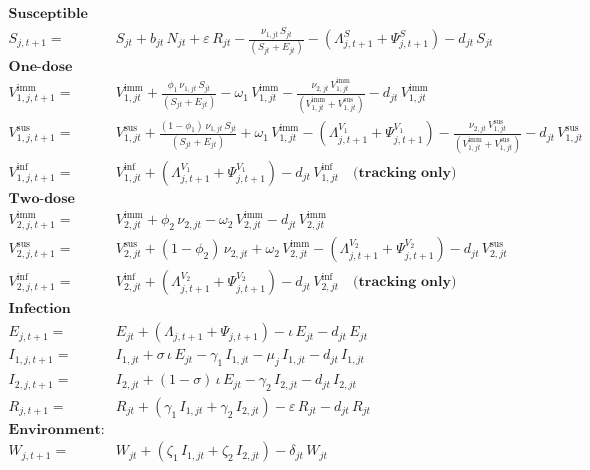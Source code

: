 \documentclass[
]{book}
\begin{document}
\begin{equation}
\begin{aligned}
\mathbf{\text{Susceptible population:}}\\[1mm]
S_{j,t+1} = \ & 
S_{jt} 
+ b_{jt}\,N_{jt} 
+ \varepsilon\,R_{jt} 
- \frac{\nu_{1,jt}\,S_{jt}}{\left(S_{jt}+E_{jt}\right)} 
- \left( \Lambda^{S}_{j,t+1} + \Psi^{S}_{j,t+1} \right) 
- d_{jt}\,S_{jt}\\[3mm]
\mathbf{\text{One-dose vaccination:}}\\[1mm]
V^{\text{imm}}_{1,j,t+1} = \ & 
V^{\text{imm}}_{1,jt} 
+ \frac{\phi_1\,\nu_{1,jt}\,S_{jt}}{\left(S_{jt}+E_{jt}\right)}
- \omega_1\,V^{\text{imm}}_{1,jt} 
- \frac{\nu_{2,jt}\,V^{\text{imm}}_{1,jt}}{\left(V^{\text{imm}}_{1,jt}+V^{\text{sus}}_{1,jt}\right)}
- d_{jt}\,V^{\text{imm}}_{1,jt}\\[1mm]
V^{\text{sus}}_{1,j,t+1} = \ & 
V^{\text{sus}}_{1,jt} 
+ \frac{\left(1-\phi_1\right)\,\nu_{1,jt}\,S_{jt}}{\left(S_{jt}+E_{jt}\right)}
+ \omega_1\,V^{\text{imm}}_{1,jt} 
- \left( \Lambda^{V_1}_{j,t+1} + \Psi^{V_1}_{j,t+1} \right) 
- \frac{\nu_{2,jt}\,V^{\text{sus}}_{1,jt}}{\left(V^{\text{imm}}_{1,jt}+V^{\text{sus}}_{1,jt}\right)} 
- d_{jt}\,V^{\text{sus}}_{1,jt}\\[1mm]
V^{\text{inf}}_{1,j,t+1} = \ & 
V^{\text{inf}}_{1,jt} 
+ \left( \Lambda^{V_1}_{j,t+1} + \Psi^{V_1}_{j,t+1} \right) 
- d_{jt}\,V^{\text{inf}}_{1,jt} \quad \mathbf{\text{(tracking only)}}\\[6mm]
\mathbf{\text{Two-dose vaccination:}}\\[3mm]
V^{\text{imm}}_{2,j,t+1} = \ & 
V^{\text{imm}}_{2,jt} 
+ \phi_2\,\nu_{2,jt} 
- \omega_2\,V^{\text{imm}}_{2,jt} 
- d_{jt}\,V^{\text{imm}}_{2,jt}\\[3mm]
V^{\text{sus}}_{2,j,t+1} = \ & 
V^{\text{sus}}_{2,jt} 
+ \left(1-\phi_2\right)\,\nu_{2,jt} 
+ \omega_2\,V^{\text{imm}}_{2,jt} 
- \left( \Lambda^{V_2}_{j,t+1} + \Psi^{V_2}_{j,t+1} \right) 
- d_{jt}\,V^{\text{sus}}_{2,jt}\\[3mm]
V^{\text{inf}}_{2,j,t+1} = \ &
V^{\text{inf}}_{2,jt} 
+ \left( \Lambda^{V_2}_{j,t+1} + \Psi^{V_2}_{j,t+1} \right) 
- d_{jt}\,V^{\text{inf}}_{2,jt} \quad \mathbf{\text{(tracking only)}}\\[6mm]
\mathbf{\text{Infection dynamics:}}\\[3mm]
E_{j,t+1} = \ &
E_{jt} 
+ \left( \Lambda_{j,t+1} + \Psi_{j,t+1}\right) 
- \iota\,E_{jt} 
- d_{jt}\,E_{jt}\\[3mm]
I_{1,j,t+1} = \ &
I_{1,jt} 
+ \sigma\,\iota\,E_{jt} 
- \gamma_1\,I_{1,jt} 
- \mu_j\,I_{1,jt} 
- d_{jt}\,I_{1,jt}\\[3mm]
I_{2,j,t+1} = \ &
I_{2,jt} 
+ \left(1-\sigma\right)\,\iota\,E_{jt} 
- \gamma_2\,I_{2,jt} 
- d_{jt}\,I_{2,jt}\\[3mm]
R_{j,t+1} = \ &
R_{jt} 
+ \left( \gamma_1\,I_{1,jt} + \gamma_2\,I_{2,jt} \right) 
- \varepsilon\,R_{jt} 
- d_{jt}\,R_{jt}\\[5mm]
\mathbf{\text{Environment:}}\\[3mm]
W_{j,t+1} = \ &
W_{jt} 
+ \left( \zeta_1\,I_{1,jt} + \zeta_2\,I_{2,jt} \right) 
- \delta_{jt}\,W_{jt}\\[3mm]
\end{aligned}
\label{eq:system}
\end{equation}
\end{document}
